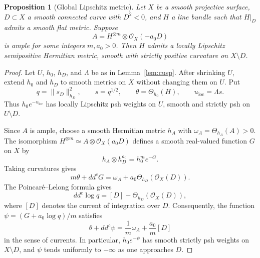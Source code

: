 \documentclass[11pt]{amsart}
\newtheorem{proposition}[theorem]{Proposition}
\theoremstyle{definition}
\theoremstyle{remark}
\numberwithin{equation}{section}
\newcommand{\OO}{\mathcal O}
\newcommand{\ddc}{dd^c}
\begin{document}
\begin{proposition}[Global Lipschitz metric]\label{prop:global-cusp}
Let $X$ be a smooth projective surface, $D\subset X$ a smooth
connected curve with $D^2<0$, and $H$ a line bundle such that
$H|_D$ admits a smooth flat metric. Suppose
\[
 A=H^{\otimes m}\otimes\OO_X(-a_0D)
\]
is ample for some integers $m,a_0>0$. Then $H$ admits a
locally Lipschitz semipositive Hermitian metric, smooth with
strictly positive curvature on $X\setminus D$.
\end{proposition}
\begin{proof}
Let $U$, $h_0$, $h_D$, and $\Lambda$ be as in
Lemma~\ref{lem:cusp}. After shrinking $U$, extend $h_0$
and $h_D$ to smooth metrics on $X$ without changing them
on $U$. Put
\[
 q=\|s_D\|_{h_D}^2,\qquad s=q^{1/2},\qquad
 \theta=\Theta_{h_0}(H),\qquad u_{\mathrm{loc}}=\Lambda s.
\]
Thus $h_0e^{-u_{\mathrm{loc}}}$ has locally Lipschitz psh
weights on $U$, smooth and strictly psh on $U\setminus D$.

Since $A$ is ample, choose a smooth Hermitian metric $h_A$
with $\omega_A=\Theta_{h_A}(A)>0$.
The isomorphism $H^{\otimes m}\simeq A\otimes\OO_X(a_0D)$
defines a smooth real-valued function $G$ on $X$ by
\[
 h_A\otimes h_D^{a_0}=h_0^m e^{-G}.
\]
Taking curvatures gives
\[
 m\theta+\ddc G
 =\omega_A+a_0\Theta_{h_D}(\OO_X(D)).
\]
The Poincar\'e--Lelong formula gives
\begin{equation}\label{eq:PL}
 \ddc\log q=[D]-\Theta_{h_D}(\OO_X(D)),
\end{equation}
where $[D]$ denotes the current of integration over $D$.
Consequently, the function
$\psi=(G+a_0\log q)/m$ satisfies
\begin{equation}\label{eq:log-curvature}
 \theta+\ddc\psi
 =\frac1m\omega_A+\frac{a_0}{m}[D]
\end{equation}
in the sense of currents.
In particular, $h_0e^{-\psi}$ has smooth strictly psh
weights on $X\setminus D$, and $\psi$ tends uniformly
to $-\infty$ as one approaches $D$.


\end{proof}
\end{document}
